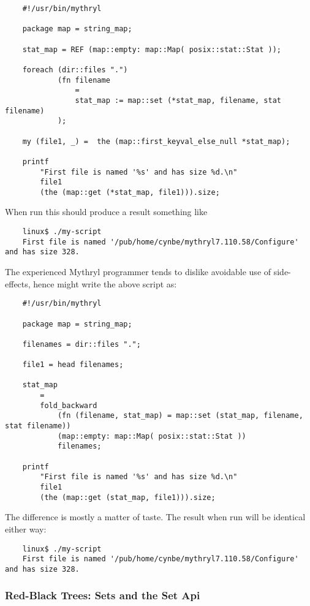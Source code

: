 \begin{verbatim}
    #!/usr/bin/mythryl

    package map = string_map;

    stat_map = REF (map::empty: map::Map( posix::stat::Stat ));

    foreach (dir::files ".")
            (fn filename
                =
                stat_map := map::set (*stat_map, filename, stat filename)
            );

    my (file1, _) =  the (map::first_keyval_else_null *stat_map);

    printf
        "First file is named '%s' and has size %d.\n"
        file1
        (the (map::get (*stat_map, file1))).size;
\end{verbatim}

When run this should produce a result something like
\begin{verbatim}
    linux$ ./my-script
    First file is named '/pub/home/cynbe/mythryl7.110.58/Configure' and has size 328.
\end{verbatim}

The experienced Mythryl programmer tends to dislike avoidable use 
of side-effects, hence might write the above script as:

\begin{verbatim}
    #!/usr/bin/mythryl

    package map = string_map;

    filenames = dir::files ".";

    file1 = head filenames;

    stat_map
        =
        fold_backward
            (fn (filename, stat_map) = map::set (stat_map, filename, stat filename))
            (map::empty: map::Map( posix::stat::Stat ))
            filenames;

    printf
        "First file is named '%s' and has size %d.\n"
        file1
        (the (map::get (stat_map, file1))).size;
\end{verbatim}

The difference is mostly a matter of taste. 
The result when run will be identical either way:

\begin{verbatim}
    linux$ ./my-script
    First file is named '/pub/home/cynbe/mythryl7.110.58/Configure' and has size 328.
\end{verbatim}

\cutend*

\subsubsection{Red-Black Trees:  Sets and the Set Api}

